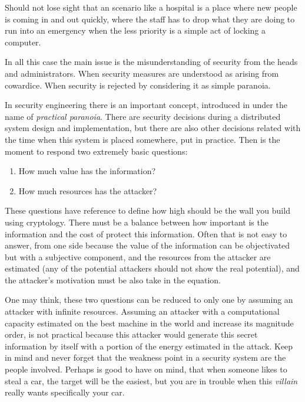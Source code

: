 \documentclass[10pt,a4paper,twoside]{llncs}
\newcommand{\todo}[1]{\texttt{\color{red}TODO:} ``\emph{#1}''}
\begin{document}
Should not lose sight that an scenario like a hospital is a place where new people is coming in and out quickly, where the staff has to drop what they are doing to run into an emergency when the less priority is a simple act of locking a computer.

In all this case the main issue is the misunderstanding of security from the heads and administrators. When security measures are understood as arising from cowardice. When security is rejected by considering it as simple paranoia.


In security engineering there is an important concept, introduced in \cite{PractCryptoSchneier} under the name of \emph{practical paranoia}. There are security decisions during a distributed system design and implementation, but there are also other decisions related with the time when this system is placed somewhere, put in practice. Then is the moment to respond two extremely basic questions: 

\begin{enumerate}
    \item How much value has the information?
    \item How much resources has the attacker?
\end{enumerate}

These questions have reference to define how high should be the wall you build using cryptology. There must be a balance between how important is the information and the cost of protect this information. Often that is not easy to answer, from one side because the value of the information can be objectivated but with a subjective component, and the resources from the attacker are estimated (any of the potential attackers should not show the real potential), and the attacker's motivation must be also take in the equation.

One may think, these two questions can be reduced to only one by assuming an attacker with infinite resources. Assuming an attacker with a computational capacity estimated on the best machine in the world and increase its magnitude order, is not practical because this attacker would generate this secret information by itself with a portion of the energy estimated in the attack. Keep in mind and never forget that the weakness point in a security system are the people involved. Perhaps is good to have on mind, that when someone likes to steal a car, the target will be the easiest, but you are in trouble when this \emph{villain} really wants specifically your car.
\end{document}
